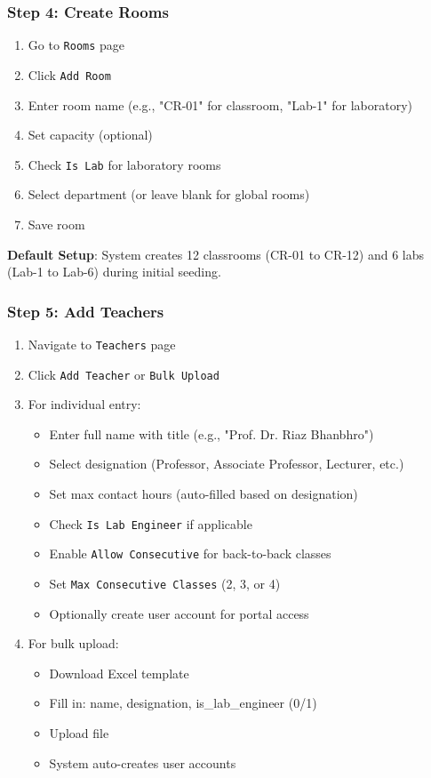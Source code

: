 \documentclass[12pt,a4paper]{article}
\begin{document}
\subsubsection{Step 4: Create Rooms}
\begin{enumerate}
    \item Go to \texttt{Rooms} page
    \item Click \texttt{Add Room}
    \item Enter room name (e.g., "CR-01" for classroom, "Lab-1" for laboratory)
    \item Set capacity (optional)
    \item Check \texttt{Is Lab} for laboratory rooms
    \item Select department (or leave blank for global rooms)
    \item Save room
\end{enumerate}

\textbf{Default Setup}: System creates 12 classrooms (CR-01 to CR-12) and 6 labs (Lab-1 to Lab-6) during initial seeding.

\subsubsection{Step 5: Add Teachers}
\begin{enumerate}
    \item Navigate to \texttt{Teachers} page
    \item Click \texttt{Add Teacher} or \texttt{Bulk Upload}
    \item For individual entry:
    \begin{itemize}
        \item Enter full name with title (e.g., "Prof. Dr. Riaz Bhanbhro")
        \item Select designation (Professor, Associate Professor, Lecturer, etc.)
        \item Set max contact hours (auto-filled based on designation)
        \item Check \texttt{Is Lab Engineer} if applicable
        \item Enable \texttt{Allow Consecutive} for back-to-back classes
        \item Set \texttt{Max Consecutive Classes} (2, 3, or 4)
        \item Optionally create user account for portal access
    \end{itemize}
    \item For bulk upload:
    \begin{itemize}
        \item Download Excel template
        \item Fill in: name, designation, is\_lab\_engineer (0/1)
        \item Upload file
        \item System auto-creates user accounts
    \end{itemize}
\end{enumerate}
\end{document}
